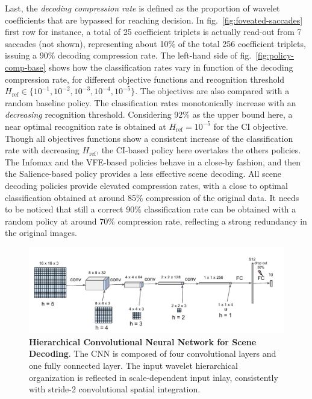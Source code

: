 \documentclass[12pt,twoside,openright]{article}
\begin{document}
Last, the \emph{decoding compression rate} is defined as the proportion of wavelet coefficients that are bypassed for reaching decision. In fig.~\ref{fig:foveated-saccades} first row for instance, a total of 25 coefficient triplets is  actually read-out from 7 saccades (not shown), representing about 10\% of the total 256 coefficient triplets, issuing a 90\% decoding compression rate. 
The left-hand side of fig.~\ref{fig:policy-comp-base} shows how the classification rates vary in function of the decoding compression rate, for different objective functions and recognition threshold $H_\text{ref} \in \{10^{-1}, 10^{-2}, 10^{-3}, 10^{-4}, 10^{-5}\}$. The objectives are also compared with a random baseline policy. The classification rates monotonically increase with an \emph{decreasing} recognition threshold. Considering 92\% as the upper bound here, a near optimal recognition rate is obtained  at $H_\text{ref}=10^{-5}$ for the CI objective. Though all objectives functions show a consistent increase of the classification rate with decreasing $H_\text{ref}$, the CI-based policy here overtakes the others policies. The Infomax and the VFE-based policies behave in a close-by fashion, and then the Salience-based policy  provides a less effective scene decoding. 
All scene decoding policies provide elevated compression rates, with a close to optimal classification obtained at around 85\% compression of the original data. It needs to be noticed that still a correct 90\% classification rate can be obtained with a random policy at around 70\% compression rate, reflecting a strong redundancy in the original images.  

\begin{figure}
	\centerline{
		\includegraphics[width = \linewidth]{img/frontiers-convolutional.pdf} 
	}
	\vspace{-.2cm}
	\caption{\textbf{Hierarchical Convolutional Neural Network for Scene Decoding}. The CNN is composed of four convolutional layers and one fully connected layer. The input wavelet hierarchical organization is reflected in scale-dependent input inlay, consistently with stride-2 convolutional spatial integration.  }\label{fig:CNN}
\end{figure}
\end{document}
